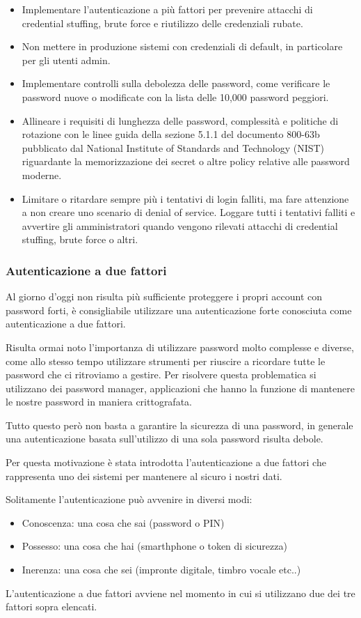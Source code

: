 \begin{itemize}
    \item Implementare l'autenticazione a più fattori per prevenire attacchi di credential stuffing, brute force e riutilizzo delle credenziali rubate.
    \item Non mettere in produzione sistemi con credenziali di default, in particolare per gli utenti admin.
    \item Implementare controlli sulla debolezza delle password, come verificare le password nuove o modificate con la lista delle 10,000 password peggiori.
    \item Allineare i requisiti di lunghezza delle password, complessità e politiche di rotazione con le linee guida della sezione 5.1.1 del documento 800-63b pubblicato dal National Institute of Standards and Technology (NIST) riguardante la memorizzazione dei secret o altre policy relative alle password moderne.
    \item Limitare o ritardare sempre più i tentativi di login falliti, ma fare attenzione a non creare uno scenario di denial of service. Loggare tutti i tentativi falliti e avvertire gli amministratori quando vengono rilevati attacchi di credential stuffing, brute force o altri.
\end{itemize}

\subsubsection{Autenticazione a due fattori}
Al giorno d’oggi non risulta più sufficiente proteggere i propri account con password forti, è consigliabile utilizzare una autenticazione forte conosciuta come autenticazione a due fattori. 

Risulta ormai noto l’importanza di utilizzare password molto complesse e diverse, come allo stesso tempo utilizzare strumenti per riuscire a ricordare tutte le password che ci ritroviamo a gestire. Per risolvere questa problematica si utilizzano dei password manager, applicazioni che hanno la funzione di mantenere le nostre password in maniera crittografata. 

Tutto questo però non basta a garantire la sicurezza di una password, in generale una autenticazione basata sull’utilizzo di una sola password risulta debole. 

Per questa motivazione è stata introdotta l’autenticazione a due fattori che rappresenta uno dei sistemi per mantenere al sicuro i nostri dati. 

Solitamente l’autenticazione può avvenire in diversi modi: 
\begin{itemize}
    \item Conoscenza: una cosa che sai (password o PIN)
    \item Possesso: una cosa che hai (smarthphone o token di sicurezza)
    \item Inerenza: una cosa che sei (impronte digitale, timbro vocale etc..)
\end{itemize}
L’autenticazione a due fattori avviene nel momento in cui si utilizzano due dei tre fattori sopra elencati. 


